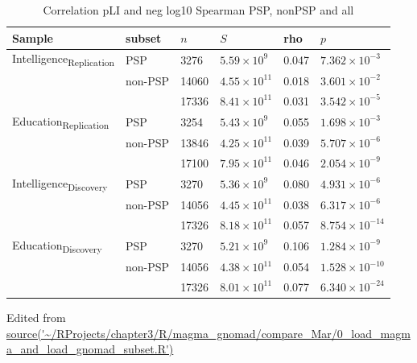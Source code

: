 \begin{table}[ht]
\centering
\setlength{\extrarowheight}{2pt}
\begin{tabular}{llllll}
  \toprule
Sample & subset & $n$ &$S$ & rho & $p$ \\ 
  \midrule
Intelligence\textsubscript{Replication} & PSP & 3276 & $5.59 \times 10^{9}$ & 0.047 & $7.362 \times 10^{-3}$ \\ 
 & non-PSP & 14060 & $4.55 \times 10^{11}$ & 0.018 & $3.601 \times 10^{-2}$ \\ 
 &  & 17336 & $8.41 \times 10^{11}$ & 0.031 & $3.542 \times 10^{-5}$  \vspace{9pt}\\ 

  Education\textsubscript{Replication} & PSP & 3254 & $5.43 \times 10^{9}$ & 0.055 & $1.698 \times 10^{-3}$ \\ 
 & non-PSP & 13846 & $4.25 \times 10^{11}$ & 0.039 & $5.707 \times 10^{-6}$ \\ 
 &  & 17100 & $7.95 \times 10^{11}$ & 0.046 & $2.054 \times 10^{-9}$\vspace{9pt} \\ 
  
  Intelligence\textsubscript{Discovery} & PSP & 3270 & $5.36 \times 10^{9}$ & 0.080 & $4.931 \times 10^{-6}$ \\ 
 & non-PSP & 14056 & $4.45 \times 10^{11}$ & 0.038 & $6.317 \times 10^{-6}$ \\ 
 &  & 17326 & $8.18 \times 10^{11}$ & 0.057 & $8.754 \times 10^{-14}$ \vspace{9pt}\\ 
  
  Education\textsubscript{Discovery} & PSP & 3270 & $5.21 \times 10^{9}$ & 0.106 & $1.284 \times 10^{-9}$ \\ 
  & non-PSP & 14056 & $4.38 \times 10^{11}$ & 0.054 & $1.528 \times 10^{-10}$ \\ 
 &  & 17326 & $8.01 \times 10^{11}$ & 0.077 & $6.340 \times 10^{-24}$ \\ 
   \bottomrule
\end{tabular}
\caption{Correlation pLI and neg log10 Spearman PSP, nonPSP and all} 
\tiny Edited from \url{source('~/RProjects/chapter3/R/magma_gnomad/compare_Mar/0_load_magma_and_load_gnomad_subset.R')} 
\label{tab: Correlation pLI and neg log10 SpearmanPSP, nonPSP and all}
\end{table}


